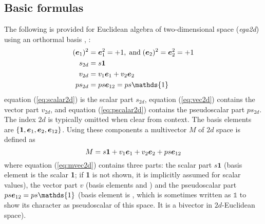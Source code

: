 \subsection{Basic formulas}
\label{basic_formulas}

The following is provided for Euclidean algebra of two-dimensional space (\emph{ega2d})
using an orthormal basis , :
\begin{subequations}
    \begin{align}
        (\bv{1})^2 & = \bv{1}^2 = +1, \;\text{and}\; (\bv{2})^2 = \bv{2}^2 = +1
        \label{eq:ega2d_base_vec} \\
        s_{2d} & = s\bm{1}
        \label{eq:scalar2d} \\
        v_{2d} & = v_1\bv{1} + v_2\bv{2} 
        \label{eq:vec2d} \\
        ps_{2d} & = ps \bv{12}  = ps\mathds{1}
        \label{eq:pscalar2d}
    \end{align}
\end{subequations}
equation (\ref{eq:scalar2d}) is the scalar part $s_{2d}$, equation (\ref{eq:vec2d})
contains the vector part $v_{2d}$, and equation (\ref{eq:pscalar2d}) contains the
pseudoscalar part $ps_{2d}$. The index $2d$ is typically omitted when clear from context.
The basis elements are $\{\bm{1}, \bm{e}_{1}, \bm{e}_{2}, \bm{e}_{12}\}$. Using these components a
multivector $M$ of $2d$ space is defined as
\begin{equation}
     M = s \bm{1} + v_1\bm{e}_{1} + v_2\bm{e}_{2} + ps\bm{e}_{12}
    \label{eq:mvec2d}   
\end{equation}
where equation (\ref{eq:mvec2d}) contains three parts: the scalar part $s\bm{1}$ (basis
element is the scalar \textbf{1}; if \textbf{1} is not shown, it is implicitly assumed for
scalar values), the vector part $v$ (basis elements  and ) and the
pseudoscalar part $ps \bv{12} = ps \mathds{1}$ (basis element is , which is
sometimes written as $\mathds{1}$ to show its character as pseudoscalar of this space. It
is a bivector in $2d$-Euclidean space). \\

